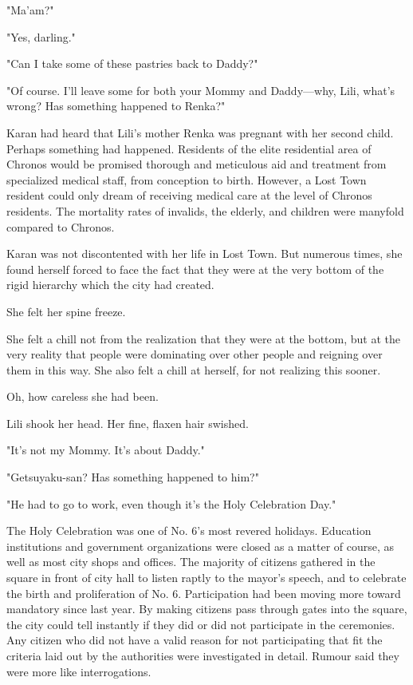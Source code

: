"Ma'am?"

"Yes, darling."

"Can I take some of these pastries back to Daddy?"

"Of course. I'll leave some for both your Mommy and Daddy---why, Lili,
what's wrong? Has something happened to Renka?"

Karan had heard that Lili's mother Renka was pregnant with her second
child. Perhaps something had happened. Residents of the elite
residential area of Chronos would be promised thorough and meticulous
aid and treatment from specialized medical staff, from conception to
birth. However, a Lost Town resident could only dream of receiving
medical care at the level of Chronos residents. The mortality rates of
invalids, the elderly, and children were manyfold compared to Chronos.

Karan was not discontented with her life in Lost Town. But numerous
times, she found herself forced to face the fact that they were at the
very bottom of the rigid hierarchy which the city had created.

She felt her spine freeze.

She felt a chill not from the realization that they were at the bottom,
but at the very reality that people were dominating over other people
and reigning over them in this way. She also felt a chill at herself,
for not realizing this sooner.

Oh, how careless she had been.

Lili shook her head. Her fine, flaxen hair swished.

"It's not my Mommy. It's about Daddy."

"Getsuyaku-san? Has something happened to him?"

"He had to go to work, even though it's the Holy Celebration Day."

The Holy Celebration was one of No. 6's most revered holidays. Education
institutions and government organizations were closed as a matter of
course, as well as most city shops and offices. The majority of citizens
gathered in the square in front of city hall to listen raptly to the
mayor's speech, and to celebrate the birth and proliferation of No. 6.
Participation had been moving more toward mandatory since last year. By
making citizens pass through gates into the square, the city could tell
instantly if they did or did not participate in the ceremonies. Any
citizen who did not have a valid reason for not participating that fit
the criteria laid out by the authorities were investigated in detail.
Rumour said they were more like interrogations.

